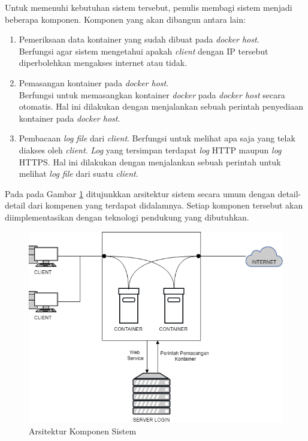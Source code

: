       \indent Untuk memenuhi kebutuhan sistem tersebut, penulis membagi sistem menjadi beberapa komponen. Komponen yang akan dibangun antara lain: 
      \begin{enumerate} 
	  \item Pemeriksaan data kontainer yang sudah dibuat pada \textit{docker host}.\\
		  Berfungsi agar sistem mengetahui apakah \textit{client} dengan IP tersebut diperbolehkan mengakses internet atau tidak.
	  \item Pemasangan kontainer pada \textit{docker host}.\\
		  Berfungsi untuk memasangkan kontainer \textit{docker} pada \textit{docker host} secara otomatis. Hal ini dilakukan dengan menjalankan sebuah perintah penyediaan kontainer pada \textit{docker host}.
	  \item Pembacaan \textit{log file} dari \textit{client}.
		  Berfungsi untuk melihat apa saja yang telak diakses oleh \textit{client}. \textit{Log} yang tersimpan terdapat \textit{log} HTTP maupun \textit{log} HTTPS. Hal ini dilakukan dengan menjalankan sebuah perintah untuk melihat \textit{log file} dari suatu \textit{client}.
        
      \end{enumerate}
      \indent Pada pada Gambar \ref{Arsitektur Komponen Sistem} ditujunkkan arsitektur sistem secara umum dengan detail-detail dari kompenen yang terdapat didalamnya. Setiap komponen tersebut akan diimplementasikan dengan teknologi pendukung yang dibutuhkan.\\
      
      \begin{figure}[H]
        \centering
        \includegraphics[width=\linewidth]{images/bab3/arsitekttur_komponen}
        \caption{Arsitektur Komponen Sistem}
        \label{Arsitektur Komponen Sistem}
      \end{figure} 
